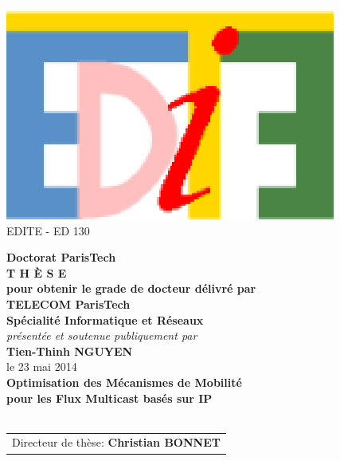 \begin{center}
%


\includegraphics[scale=0.65]{logo_edite.eps} \\
{\small {EDITE - ED 130}}


%
\vspace{.5cm}
%
%
%
%
%
%
\vspace{1.0cm}
%
%
%
{\LARGE {\bf Doctorat ParisTech}}\\
\vspace{1.1cm}
{\LARGE {\bf T H È S E}}\\
\vspace{0.5cm}
{\normalsize {\bf pour obtenir le grade de docteur délivré par}}\\
%
%
%
\vspace{.9cm}
%
%
%
%
{\LARGE {\bf TELECOM ParisTech}}\\
\vspace{0.6cm}
{\Large {\bf Spécialité \og Informatique et Réseaux \fg}}\\
%
%
%
\vspace{.8cm}
%
%
%
{\normalsize {\it présentée et soutenue publiquement par}}\\
\vspace{0.7cm}
{\Large {\bf Tien-Thinh NGUYEN}}\\
\vspace{0.24cm}
{\normalsize le 23 mai 2014}\\
%
%
%
\vfill
%
%
%
\textcolor[RGB]{191,18,56}{
\noindent
{\LARGE {\bf Optimisation des Mécanismes de Mobilité \\[.6cm]pour les Flux Multicast basés sur IP}}\\
}
%
%
%
\vfill~\vfill
%
%
%
{\normalsize
\begin{tabular}{c}
Directeur de thèse:					{\bf Christian BONNET}\\
\end{tabular}
}
\end{center}
